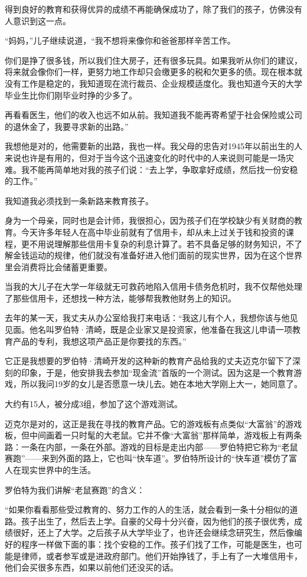 得到良好的教育和获得优异的成绩不再能确保成功了，除了我们的孩子，仿佛没有人意识到这一点。

“妈妈，”儿子继续说道，“我不想将来像你和爸爸那样辛苦工作。

你们是挣了很多钱，所以我们住大房子，还有很多玩具。如果我听从你们的建议，将来就会像你们一样，更努力地工作却只会缴更多的税和欠更多的债。现在根本就没有工作是稳定的，我知道现在流行裁员、企业规模适度化。我也知道今天的大学毕业生比你们刚毕业时挣的少多了。

再看看医生，他们的收入也远不如从前。我知道我不能再寄希望于社会保险或公司的退休金了，我要寻求新的出路。”

我想他是对的，他需要新的出路，我也一样。我父母的忠告对1945年以前出生的人来说也许是有用的，但对于当今这个迅速变化的时代中的人来说则可能是一场灾难。我不能再简单地对我的孩子们说：“去上学，争取拿好成绩，然后找一份安稳的工作。”

我知道我必须找到一条新路来教育孩子。

身为一个母亲，同时也是会计师，我很担心，因为孩子们在学校缺少有关财商的教育。今天许多年轻人在高中毕业前就有了信用卡，却从未上过关于钱和投资的课程，更不用说理解那些信用卡复杂的利息计算了。若不具备足够的财务知识，不了解金钱运动的规律，他们就没有准备好进入他们面前的现实世界，因为在这个世界里会消费将比会储蓄更重要。

当我的大儿子在大学一年级就无可救药地陷入信用卡债务危机时，我不仅帮他处理了那些信用卡，还想找一种方法，能够帮我教他财务上的知识。

去年的某一天，我丈夫从办公室给我打来电话：“我这儿有个人，我想你该与他见见面。他名叫罗伯特·清崎，既是企业家又是投资家，他准备在我这儿申请一项教育产品的专利，我想这项产品正是你要找的东西。”

它正是我想要的罗伯特·清崎开发的这种新的教育产品给我的丈夫迈克尔留下了深刻的印象，于是，他安排我去参加“现金流”首版的一个测试。因为这是一个教育游戏，所以我问19岁的女儿是否愿意一块儿去。她在本地大学刚上大一，她同意了。

大约有15人，被分成3组，参加了这个游戏测试。

迈克尔是对的，这正是我在寻找的教育产品。它的游戏板有点类似“大富翁”的游戏板，但中间画着一只时髦的大老鼠。它并不像“大富翁”那样简单，游戏板上有两条路：一条在内部，一条在外部。游戏的目标是走出内部——罗伯特把它称为“老鼠赛跑”——来到外面的路上，它也叫“快车道”。罗伯特所设计的“快车道”模仿了富人在现实世界中的生活。

罗伯特为我们讲解“老鼠赛跑”的含义：

“如果你看看那些受过教育的、努力工作的人的生活，就会看到一条十分相似的道路。孩子出生了，然后去上学。自豪的父母十分兴奋，因为他们的孩子很优秀，成绩很好，还上了大学。之后孩子从大学毕业了，也许还会继续念研究生，然后像编好的程序一样做下面的事：找个安稳的工作。孩子们找了工作，可能是医生，也可能是律师，或者参军或是进政府部门。他们开始挣钱了，手上有了一大堆信用卡，他们会买很多东西，如果以前他们还没买的话。

